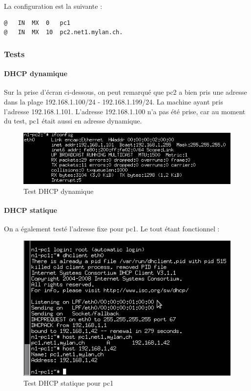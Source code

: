 \documentclass{article}
\begin{document}
La configuration est la suivante : 

\begin{lstlisting}
@	IN	MX	0	pc1
@	IN	MX	10	pc2.net1.mylan.ch.
\end{lstlisting}

\subsubsection{Tests}

\paragraph{DHCP dynamique}

Sur la prise d'écran ci-dessous, on peut remarqué que pc2 a bien pris une adresse dans la plage 192.168.1.100/24 - 192.168.1.199/24. La machine ayant pris l'adresse 192.168.1.101. L'adresse 192.168.1.100 n'a pas été prise, car au moment du test, pc1 était aussi en adresse dynamique.

\begin{figure}[h]
	\centering
	\includegraphics{./captures/testpc2-dhcp.png}
	\caption{Test DHCP dynamique}
	\label{fig:Test DHCP dynamiqu}
\end{figure}

\paragraph{DHCP statique}

On a également testé l'adresse fixe pour pc1. Le tout étant fonctionnel :

\begin{figure}[h]
	\centering
	\includegraphics{./captures/7-testfixadress.png}
	\caption{Test DHCP statique pour pc1}
	\label{fig:Test DHCP statique pour pc1}
\end{figure}
\end{document}
